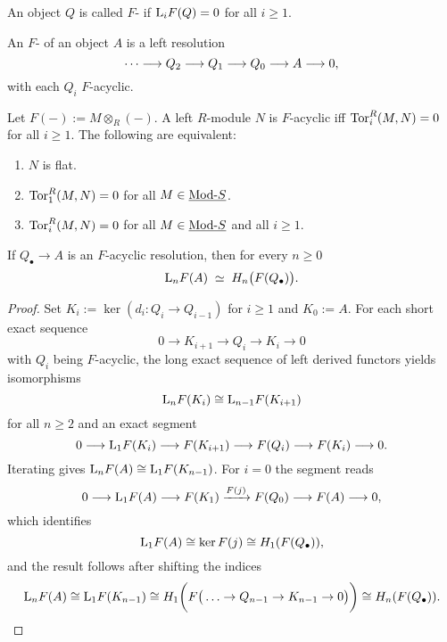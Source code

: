 \begin{definition*}
	An object \( Q \) is called \( F \)- if \( \mathrm L_iF(Q)=0 \) for all \( i\ge 1 \).
\end{definition*}

\begin{definition*}
	An \( F \)- of an object \( A \) is a left resolution
	\[
		\dotsm \longrightarrow Q_2 \longrightarrow Q_1 \longrightarrow Q_0 \longrightarrow A \longrightarrow 0,
	\]
	with each \( Q_i \) \( F \)-acyclic.
\end{definition*}

\begin{example*}
	Let \( F(-):= M\otimes_R(-) \). A left \( R \)-module \( N \) is \( F \)-acyclic iff \( \operatorname{Tor}_i^R(M,N)=0 \) for all \( i\ge 1 \). The following are equivalent:
	\begin{enumerate}
		\item \( N \) is flat.
		\item \( \operatorname{Tor}_1^R(M,N)=0 \) for all \( M\in \underline{\mathrm{Mod}\text{-}S} \).
		\item \( \operatorname{Tor}_i^R(M,N)=0 \) for all \( M\in \underline{\mathrm{Mod}\text{-}S} \) and all \( i\ge 1 \).
	\end{enumerate}
\end{example*}

\begin{proposition*}
	If \( Q_\bullet \to A \) is an \( F \)-acyclic resolution, then for every \( n\ge 0 \)
	\[
		\mathrm L_n F(A)\;\simeq\; H_n\bigl(F(Q_\bullet)\bigr).
	\]
\end{proposition*}

\begin{proof}
	Set \( K_i := \ker(d_i: Q_i\to Q_{i-1}) \) for \( i\ge 1 \) and \( K_0:=A \). For each short exact sequence
	\[
		0\to K_{i+1}\to Q_i\to K_i\to 0
	\]
	with \( Q_i \) being \( F \)-acyclic, the long exact sequence of left derived functors yields isomorphisms
	\[
		\mathrm L_nF(K_i)\cong \mathrm L_{n-1}F(K_{i+1})
	\]
	for all \( n\ge 2 \) and an exact segment
	\[
		0\longrightarrow \mathrm L_1F(K_i)\longrightarrow F(K_{i+1}) \longrightarrow F(Q_i)\longrightarrow F(K_i)\longrightarrow 0.
	\]
	Iterating gives \( \mathrm L_nF(A)\cong \mathrm L_1F(K_{n-1}) \). For \( i=0 \) the segment reads
	\[
		0\longrightarrow \mathrm L_1F(A)\longrightarrow F(K_1)\xrightarrow{F(j)} F(Q_0)\longrightarrow F(A)\longrightarrow 0,
	\]
	which identifies
	\[
		\mathrm L_1F(A) \cong \ker F(j) \cong H_1(F(Q_\bullet)),
	\]
	and the result follows after shifting the indices
	\[
		\mathrm L_n F(A) \cong \mathrm L_1 F(K_{n - 1}) \cong H_1\biggl(F\bigl(\,\dotsc \to Q_{n - 1} \to K_{n - 1} \to 0\bigr)\biggr) \cong H_n (F(Q_\bullet)).
	\]
\end{proof}


